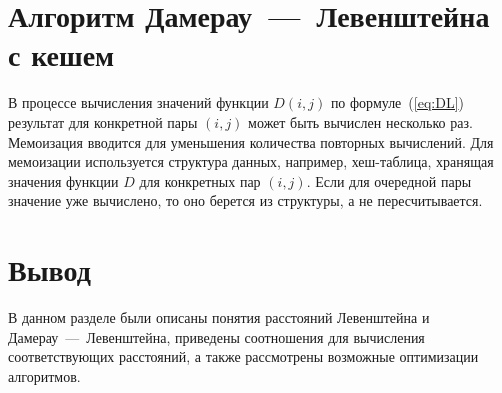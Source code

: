 \section{Алгоритм Дамерау~---~Левенштейна с кешем}
В процессе вычисления значений функции $D(i,j)$ по формуле~(\ref{eq:DL}) результат для конкретной пары $(i, j)$ может быть вычислен несколько раз. Мемоизация вводится для уменьшения количества повторных вычислений. Для мемоизации используется структура данных, например, хеш-таблица, хранящая значения функции $D$ для конкретных пар $(i, j)$. Если для очередной пары значение уже вычислено, то оно берется из структуры, а не пересчитывается.

\section*{Вывод}

В данном разделе были описаны понятия расстояний Левенштейна и Дамерау~---~Левенштейна, приведены соотношения для вычисления соответствующих расстояний, а также рассмотрены возможные оптимизации алгоритмов.
